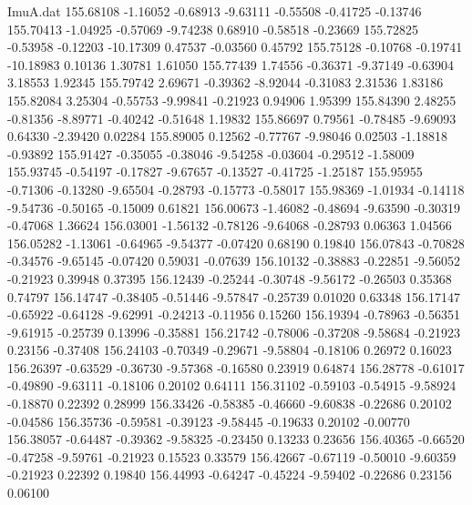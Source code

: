 \begin{filecontents}{ImuA.dat}
 155.68108   -1.16052   -0.68913   -9.63111   -0.55508   -0.41725   -0.13746
 155.70413   -1.04925   -0.57069   -9.74238    0.68910   -0.58518   -0.23669
 155.72825   -0.53958   -0.12203  -10.17309    0.47537   -0.03560    0.45792
 155.75128   -0.10768   -0.19741  -10.18983    0.10136    1.30781    1.61050
 155.77439    1.74556   -0.36371   -9.37149   -0.63904    3.18553    1.92345
 155.79742    2.69671   -0.39362   -8.92044   -0.31083    2.31536    1.83186
 155.82084    3.25304   -0.55753   -9.99841   -0.21923    0.94906    1.95399
 155.84390    2.48255   -0.81356   -8.89771   -0.40242   -0.51648    1.19832
 155.86697    0.79561   -0.78485   -9.69093    0.64330   -2.39420    0.02284
 155.89005    0.12562   -0.77767   -9.98046    0.02503   -1.18818   -0.93892
 155.91427   -0.35055   -0.38046   -9.54258   -0.03604   -0.29512   -1.58009
 155.93745   -0.54197   -0.17827   -9.67657   -0.13527   -0.41725   -1.25187
 155.95955   -0.71306   -0.13280   -9.65504   -0.28793   -0.15773   -0.58017
 155.98369   -1.01934   -0.14118   -9.54736   -0.50165   -0.15009    0.61821
 156.00673   -1.46082   -0.48694   -9.63590   -0.30319   -0.47068    1.36624
 156.03001   -1.56132   -0.78126   -9.64068   -0.28793    0.06363    1.04566
 156.05282   -1.13061   -0.64965   -9.54377   -0.07420    0.68190    0.19840
 156.07843   -0.70828   -0.34576   -9.65145   -0.07420    0.59031   -0.07639
 156.10132   -0.38883   -0.22851   -9.56052   -0.21923    0.39948    0.37395
 156.12439   -0.25244   -0.30748   -9.56172   -0.26503    0.35368    0.74797
 156.14747   -0.38405   -0.51446   -9.57847   -0.25739    0.01020    0.63348
 156.17147   -0.65922   -0.64128   -9.62991   -0.24213   -0.11956    0.15260
 156.19394   -0.78963   -0.56351   -9.61915   -0.25739    0.13996   -0.35881
 156.21742   -0.78006   -0.37208   -9.58684   -0.21923    0.23156   -0.37408
 156.24103   -0.70349   -0.29671   -9.58804   -0.18106    0.26972    0.16023
 156.26397   -0.63529   -0.36730   -9.57368   -0.16580    0.23919    0.64874
 156.28778   -0.61017   -0.49890   -9.63111   -0.18106    0.20102    0.64111
 156.31102   -0.59103   -0.54915   -9.58924   -0.18870    0.22392    0.28999
 156.33426   -0.58385   -0.46660   -9.60838   -0.22686    0.20102   -0.04586
 156.35736   -0.59581   -0.39123   -9.58445   -0.19633    0.20102   -0.00770
 156.38057   -0.64487   -0.39362   -9.58325   -0.23450    0.13233    0.23656
 156.40365   -0.66520   -0.47258   -9.59761   -0.21923    0.15523    0.33579
 156.42667   -0.67119   -0.50010   -9.60359   -0.21923    0.22392    0.19840
 156.44993   -0.64247   -0.45224   -9.59402   -0.22686    0.23156    0.06100

\end{filecontents}
